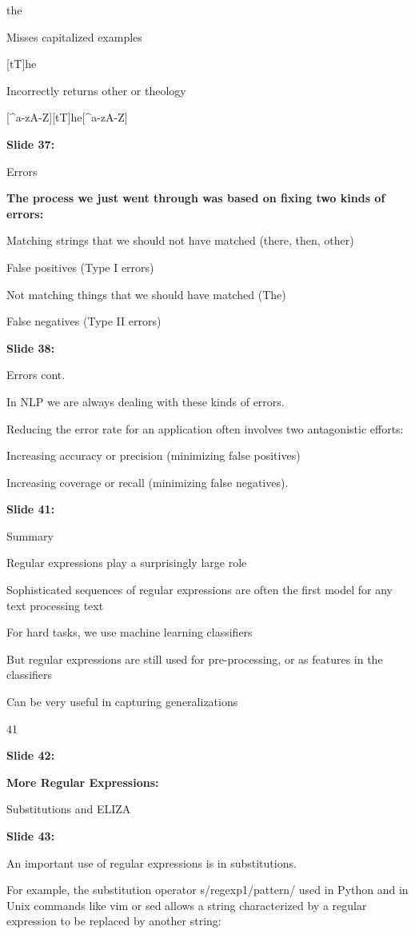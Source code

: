\documentclass[11pt,a4paper]{article}
\begin{document}
the

Misses capitalized examples

[tT]he

Incorrectly returns other or theology

[^a-zA-Z][tT]he[^a-zA-Z]

\textbf{Slide 37:}

Errors

\textbf{The process we just went through was based on fixing two kinds of errors:} 

Matching strings that we should not have matched (there, then, other)

False positives (Type I errors)

Not matching things that we should have matched (The)

False negatives (Type II errors)

\textbf{Slide 38:}

Errors cont.

In NLP we are always dealing with these kinds of errors.

Reducing the error rate for an application often involves two antagonistic efforts:

Increasing accuracy or precision (minimizing false positives)

Increasing coverage or recall (minimizing false negatives).

\textbf{Slide 41:}

Summary

Regular expressions play a surprisingly large role

Sophisticated sequences of regular expressions are often the first model for any text processing text

For hard tasks, we use machine learning classifiers

But regular expressions are still used for pre-processing, or as features in the classifiers

Can be very useful in capturing generalizations

41

\textbf{Slide 42:}

\textbf{More Regular Expressions:} 

Substitutions and ELIZA

\textbf{Slide 43:}

An important use of regular expressions is in substitutions.

For example, the substitution operator s/regexp1/pattern/ used in Python and in Unix commands like vim or sed allows a string characterized by a regular expression to be replaced by another string:
\end{document}
